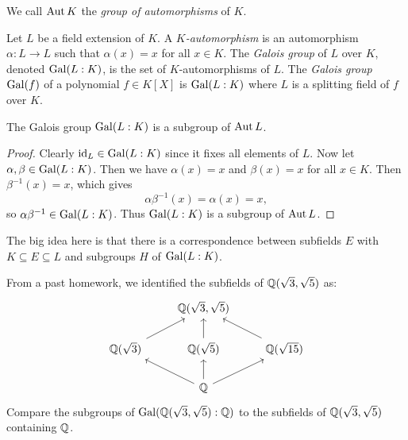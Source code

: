 \begin{definition}
  We call $\operatorname{Aut} K$ the \emph{group of automorphisms}
  of $K$.
\end{definition}

\begin{definition}
  Let $L$ be a field extension of $K$. A
  \emph{$K$-automorphism} is an automorphism
  $\alpha : L \to L$
  such that $\alpha(x) = x$ for all $x \in K$. The
  \emph{Galois group} of $L$ over $K$, denoted
  $\operatorname{Gal}(L : K)$, is the set of $K$-automorphisms of $L$.
  The \emph{Galois group} $\operatorname{Gal}(f)$ of a polynomial
  $f \in K[X]$ is $\operatorname{Gal}(L : K)$ where $L$ is a splitting
  field of $f$ over $K$.
\end{definition}

\begin{theorem}
  The Galois group $\operatorname{Gal}(L : K)$ is a subgroup of
  $\operatorname{Aut} L$.
\end{theorem}

\begin{proof}
  Clearly $\mathrm{id}_L \in \operatorname{Gal}(L : K)$ since it fixes all
  elements of $L$. Now let $\alpha, \beta \in \operatorname{Gal}(L : K)$.
  Then we have $\alpha(x) = x$ and $\beta(x) = x$ for
  all $x \in K$. Then $\beta^{-1}(x) = x$, which gives
  \[
    \alpha \beta^{-1}(x) = \alpha(x) = x,
  \]
  so $\alpha \beta^{-1} \in \operatorname{Gal}(L : K)$. Thus
  $\operatorname{Gal}(L : K)$ is a subgroup of $\operatorname{Aut} L$.
\end{proof}

\begin{remark}
  The big idea here is that there is a correspondence
  between subfields $E$ with $K \subseteq E \subseteq L$
  and subgroups $H$ of $\operatorname{Gal}(L : K)$.
\end{remark}

\begin{exercise}
  From a past homework, we identified the subfields
  of $\mathbb{Q}(\sqrt{3}, \sqrt{5})$ as:
  \[
  \begin{tikzcd}
    & \Q(\sqrt{3}, \sqrt{5}) \\
    \Q(\sqrt{3}) \urar & \Q(\sqrt{5}) \uar & \Q(\sqrt{15}) \ular \\
    & \Q \ular \uar \urar
  \end{tikzcd}
  \]
  Compare the subgroups of $\operatorname{Gal}(\mathbb{Q}(\sqrt{3}, \sqrt{5}) : \mathbb{Q})$
  to the subfields of $\mathbb{Q}(\sqrt{3}, \sqrt{5})$ containing
  $\mathbb{Q}$.
\end{exercise}
